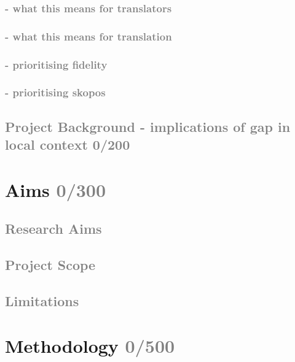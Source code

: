 \documentclass[12pt]{article}
\begin{document}
        \subsubsection{\textcolor{gray}{- what this means for translators}}            
        
        \subsubsection{\textcolor{gray}{- what this means for translation}}
        
        \subsubsection{\textcolor{gray}{- prioritising fidelity}}        
        
        \subsubsection{\textcolor{gray}{- prioritising skopos}}     

    \subsection{\textcolor{gray}{Project Background - implications of gap in local context 0/200}}

\section{Aims \textcolor{gray}{0/300}}
    \subsection{\textcolor{gray}{Research Aims}}
    
    \subsection{\textcolor{gray}{Project Scope}}
    
    \subsection{\textcolor{gray}{Limitations}}    
    
\section{Methodology \textcolor{gray}{0/500}}
\end{document}
